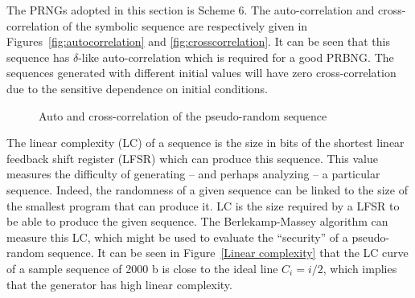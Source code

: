 The PRNGs adopted in this section is Scheme 6.
The auto-correlation and cross-correlation of the symbolic sequence are respectively given in Figures~\ref{fig:autocorrelation} and \ref{fig:crosscorrelation}. It can be seen that this sequence has $\delta$-like auto-correlation which is required for a good PRBNG. The sequences generated with different initial values will have zero cross-correlation due to the sensitive dependence on initial conditions.



\begin{figure}[h!] 
\centering
{}
\caption{Auto and cross-correlation of the pseudo-random sequence}
\label{The auto-correlation &The cross-correlation of the pseudo-random sequence}
\end{figure}


The linear complexity (LC) of a sequence is the size in bits of the shortest linear feedback shift register (LFSR) which can produce this sequence. This value measures the difficulty of generating -- and perhaps analyzing -- a particular sequence.
Indeed, the randomness of a given sequence can be linked to the size of the smallest program that can produce it. LC is the size required by a LFSR to be able to produce the given sequence. The Berlekamp-Massey algorithm can measure this LC, which might be used to evaluate the ``security'' of a pseudo-random sequence.
It can be seen in Figure~\ref{Linear complexity} that the LC curve of a sample sequence of 2000 b is close to the ideal line $C_i=i/2$, which implies that the generator has high linear complexity. 



